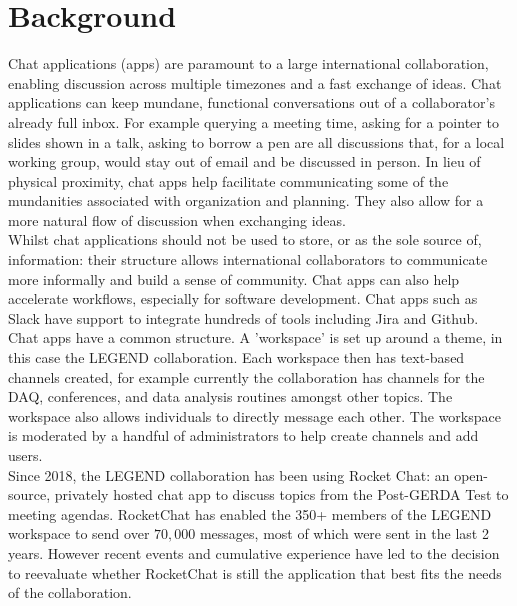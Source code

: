 \documentclass[11pt,letterpaper]{article}
\begin{document}
\section{Background}
Chat applications (apps) are paramount to a large international collaboration, enabling discussion across multiple timezones and a fast exchange of ideas. Chat applications can keep mundane, functional conversations out of a collaborator's already full inbox. For example querying a meeting time, asking for a pointer to slides shown in a talk, asking to borrow a pen are all discussions that, for a local working group, would stay out of email and be discussed in person. In lieu of physical proximity, chat apps help facilitate communicating some of the mundanities associated with organization and planning. They also allow for a more natural flow of discussion when exchanging ideas. \\
Whilst chat applications should not be used to store, or as the sole source of, information: their structure allows international collaborators to communicate more informally and build a sense of community. Chat apps can also help accelerate workflows, especially for software development. Chat apps such as Slack have support to integrate hundreds of tools including Jira and Github. \\
Chat apps have a common structure. A 'workspace' is set up around a theme, in this case the LEGEND collaboration. Each workspace then has text-based channels created, for example currently the collaboration has channels for the DAQ, conferences, and data analysis routines amongst other topics. The workspace also allows individuals to directly message each other. The workspace is moderated by a handful of administrators to help create channels and add users. \\

Since 2018, the LEGEND collaboration has been using Rocket Chat: an open-source, privately hosted chat app to discuss topics from the Post-GERDA Test to meeting agendas. RocketChat has enabled the 350+ members of the LEGEND workspace to send over $70,000$ messages, most of which were sent in the last 2 years. 
However recent events and cumulative experience have led to the decision to reevaluate whether RocketChat is still the application that best fits the needs of the collaboration. 
\end{document}
